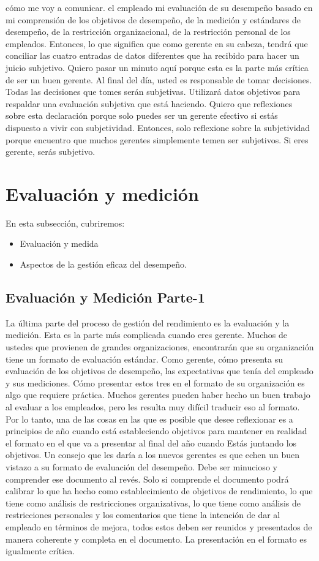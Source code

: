 \documentclass[10pt]{book}
\begin{document}
cómo me voy a comunicar. el empleado mi evaluación de su desempeño basado en mi comprensión de los objetivos de desempeño, de la medición y estándares de desempeño, de la restricción organizacional, de la restricción personal de los empleados. Entonces, lo que significa que como gerente en su cabeza, tendrá que conciliar las cuatro entradas de datos diferentes que ha recibido para hacer un juicio subjetivo. Quiero pasar un minuto aquí porque esta es la parte más crítica de ser un buen gerente. Al final del día, usted es responsable de tomar decisiones. Todas las decisiones que tomes serán subjetivas. Utilizará datos objetivos para respaldar una evaluación subjetiva que está haciendo. Quiero que reflexiones sobre esta declaración porque solo puedes ser un gerente efectivo si estás dispuesto a vivir con subjetividad. Entonces, solo reflexione sobre la subjetividad porque encuentro que muchos gerentes simplemente temen ser subjetivos. Si eres gerente, serás subjetivo. 
\section{Evaluación y medición}
En esta subsección, cubriremos:
\begin{itemize}
\item Evaluación y medida
\item Aspectos de la gestión eficaz del desempeño.
\end{itemize}
\subsection{Evaluación y Medición Parte-1}
La última parte del proceso de gestión del rendimiento es la evaluación y la medición. Esta es la parte más complicada cuando eres gerente. Muchos de ustedes que provienen de grandes organizaciones, encontrarán que su organización tiene un formato de evaluación estándar. Como gerente, cómo presenta su evaluación de los objetivos de desempeño, las expectativas que tenía del empleado y sus mediciones. Cómo presentar estos tres en el formato de su organización es algo que requiere práctica. Muchos gerentes pueden haber hecho un buen trabajo al evaluar a los empleados, pero les resulta muy difícil traducir eso al formato. Por lo tanto, una de las cosas en las que es posible que desee reflexionar es a principios de año cuando está estableciendo objetivos para mantener en realidad el formato en el que va a presentar al final del año cuando Estás juntando los objetivos. Un consejo que les daría a los nuevos gerentes es que echen un buen vistazo a su formato de evaluación del desempeño. Debe ser minucioso y comprender ese documento al revés. Solo si comprende el documento podrá calibrar lo que ha hecho como establecimiento de objetivos de rendimiento, lo que tiene como análisis de restricciones organizativas, lo que tiene como análisis de restricciones personales y los comentarios que tiene la intención de dar al empleado en términos de mejora, todos estos deben ser reunidos y presentados de manera coherente y completa en el documento. La presentación en el formato es igualmente crítica.
\end{document}
